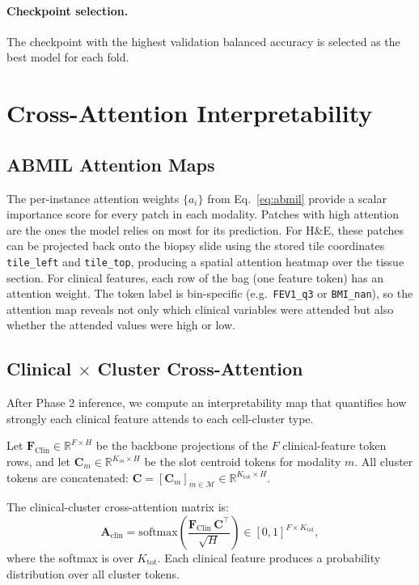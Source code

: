 \documentclass[11pt,a4paper]{article}
\begin{document}
\paragraph{Checkpoint selection.}
The checkpoint with the highest validation balanced accuracy is selected as the
best model for each fold.

\section{Cross-Attention Interpretability}

\subsection{ABMIL Attention Maps}

The per-instance attention weights $\{a_i\}$ from Eq.~\eqref{eq:abmil}
provide a scalar importance score for every patch in each modality.
Patches with high attention are the ones the model relies on most for its
prediction.
For H\&E, these patches can be projected back onto the biopsy slide using the
stored tile coordinates \texttt{tile\_left} and \texttt{tile\_top}, producing
a spatial attention heatmap over the tissue section.
For clinical features, each row of the bag (one feature token) has an
attention weight.
The token label is bin-specific (e.g.\ \texttt{FEV1\_q3} or
\texttt{BMI\_nan}), so the attention map reveals not only which clinical
variables were attended but also whether the attended values were high or low.

\subsection{Clinical $\times$ Cluster Cross-Attention}

After Phase 2 inference, we compute an interpretability map that quantifies
how strongly each clinical feature attends to each cell-cluster type.

Let $\mathbf{F}_\text{Clin}\in\mathbb{R}^{F\times H}$ be the backbone
projections of the $F$ clinical-feature token rows, and let
$\mathbf{C}_m\in\mathbb{R}^{K_m\times H}$ be the slot centroid tokens for
modality $m$.
All cluster tokens are concatenated:
$\mathbf{C} = [\mathbf{C}_m]_{m\in\mathcal{M}}\in\mathbb{R}^{K_\text{tot}\times H}$.

The clinical-cluster cross-attention matrix is:
\begin{equation}
    \mathbf{A}_\text{clin} = \text{softmax}\!\left(
        \frac{\mathbf{F}_\text{Clin}\,\mathbf{C}^\top}{\sqrt{H}}
    \right) \in [0,1]^{F\times K_\text{tot}},
    \label{eq:clin_clust_attn}
\end{equation}
where the softmax is over $K_\text{tot}$.
Each clinical feature produces a probability distribution over all cluster
tokens.
\end{document}

